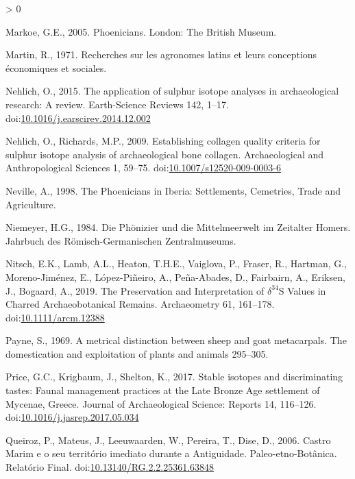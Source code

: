 \documentclass[5p]{elsarticle} %
\newlength{\cslhangindent}
\newenvironment{CSLReferences}[2] %
 {%
  \setlength{\parindent}{0pt}
  \ifodd #1 \everypar{\setlength{\hangindent}{\cslhangindent}}\ignorespaces\fi
  \ifnum #2 > 0
  \setlength{\parskip}{#2\baselineskip}
  \fi
 }%
 {}
\begin{document}
\begin{CSLReferences}{1}{0}
\leavevmode\hypertarget{ref-markoe05}{}%
Markoe, G.E., 2005. Phoenicians. {London}: {The British Museum}.

\leavevmode\hypertarget{ref-martin71}{}%
Martin, R., 1971. Recherches sur les agronomes latins et leurs conceptions économiques et sociales.

\leavevmode\hypertarget{ref-nehlich15}{}%
Nehlich, O., 2015. The application of sulphur isotope analyses in archaeological research: {A} review. Earth-Science Reviews 142, 1--17. doi:\href{https://doi.org/10.1016/j.earscirev.2014.12.002}{10.1016/j.earscirev.2014.12.002}

\leavevmode\hypertarget{ref-nehlich_richards09}{}%
Nehlich, O., Richards, M.P., 2009. Establishing collagen quality criteria for sulphur isotope analysis of archaeological bone collagen. Archaeological and Anthropological Sciences 1, 59--75. doi:\href{https://doi.org/10.1007/s12520-009-0003-6}{10.1007/s12520-009-0003-6}

\leavevmode\hypertarget{ref-neville98}{}%
Neville, A., 1998. The {Phoenicians} in {Iberia}: {Settlements}, {Cemetries}, {Trade} and {Agriculture}.

\leavevmode\hypertarget{ref-niemeyer84}{}%
Niemeyer, H.G., 1984. Die {Phönizier} und die {Mittelmeerwelt} im {Zeitalter Homers}. {Jahrbuch des Römisch-Germanischen Zentralmuseums}.

\leavevmode\hypertarget{ref-nitsch_etal19}{}%
Nitsch, E.K., Lamb, A.L., Heaton, T.H.E., Vaiglova, P., Fraser, R., Hartman, G., Moreno-Jiménez, E., López-Piñeiro, A., Peña-Abades, D., Fairbairn, A., Eriksen, J., Bogaard, A., 2019. The {Preservation} and {Interpretation} of {\(\delta^{34}\)S Values} in {Charred Archaeobotanical Remains}. Archaeometry 61, 161--178. doi:\href{https://doi.org/10.1111/arcm.12388}{10.1111/arcm.12388}

\leavevmode\hypertarget{ref-payne69}{}%
Payne, S., 1969. A metrical distinction between sheep and goat metacarpals. The domestication and exploitation of plants and animals 295--305.

\leavevmode\hypertarget{ref-price_etal17}{}%
Price, G.C., Krigbaum, J., Shelton, K., 2017. Stable isotopes and discriminating tastes: {Faunal} management practices at the {Late Bronze Age} settlement of {Mycenae}, {Greece}. Journal of Archaeological Science: Reports 14, 116--126. doi:\href{https://doi.org/10.1016/j.jasrep.2017.05.034}{10.1016/j.jasrep.2017.05.034}

\leavevmode\hypertarget{ref-queiroz_etal06}{}%
Queiroz, P., Mateus, J., Leeuwaarden, W., Pereira, T., Dise, D., 2006. Castro {Marim} e o seu território imediato durante a {Antiguidade}. {Paleo}-etno-{Botânica}. {Relatório Final}. doi:\href{https://doi.org/10.13140/RG.2.2.25361.63848}{10.13140/RG.2.2.25361.63848}


\end{CSLReferences}
\end{document}
